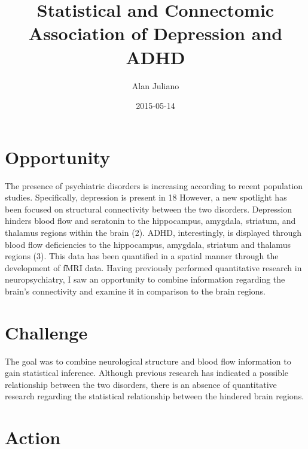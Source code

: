 \documentclass{article}
\begin{document}
\title{Statistical and Connectomic Association of Depression and ADHD}
\date{2015-05-14}
\author{Alan Juliano}

\maketitle

\section{Opportunity}

The presence of psychiatric disorders is increasing according to recent population studies. Specifically, depression is present in 18%
However, a new spotlight has been focused on structural connectivity between the two disorders.
Depression hinders blood flow and seratonin to the hippocampus, amygdala, striatum, and thalamus regions within the brain (2). ADHD, interestingly, is displayed through blood flow deficiencies to the hippocampus, amygdala, striatum and thalamus regions (3). This data has been quantified in a spatial manner through the development of fMRI data. Having previously performed quantitative research in neuropsychiatry, I saw an opportunity to combine information regarding the brain’s connectivity and examine it in comparison to the brain regions.


\section{Challenge}

The goal was to combine neurological structure and blood flow information to gain statistical inference. Although previous research has indicated a possible relationship between the two disorders, there is an absence of quantitative research regarding the statistical relationship between the hindered brain regions. 

\section{Action}
\end{document}
